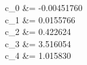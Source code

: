 c_0 &= -0.00451760 \\ 
c_1 &= 0.0155766 \\ 
c_2 &= 0.422624 \\ 
c_3 &= 3.516054 \\ 
c_4 &= 1.015830 \\ 
